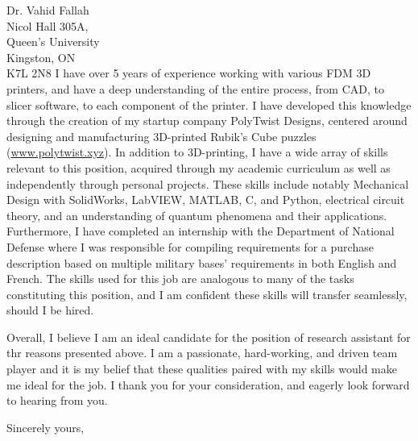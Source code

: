 \documentclass[11pt]{letter} %
\begin{document}
\begin{letter}{Dr. Vahid Fallah \\
Nicol Hall 305A, \\
Queen's University \\
Kingston, ON \\
K7L 2N8}
I have over 5 years of experience working with various FDM 3D printers, and have a deep understanding of the entire process, from CAD, to slicer software, to each component of the printer. I have developed this knowledge through the creation of my startup company PolyTwist Designs, centered around designing and manufacturing 3D-printed Rubik's Cube puzzles (\url{www.polytwist.xyz}). In addition to 3D-printing, I have a wide array of skills relevant to this position, acquired through my academic curriculum as well as independently through personal projects. These skills include notably Mechanical Design with SolidWorks, LabVIEW, MATLAB, C, and Python, electrical circuit theory, and an understanding of quantum phenomena and their applications. Furthermore, I have completed an internship with the Department of National Defense where I was responsible for compiling requirements for a purchase description based on multiple military bases' requirements in both English and French. The skills used for this job are analogous to many of the tasks constituting this position, and I am confident these skills will transfer seamlessly, should I be hired.

Overall, I believe I am an ideal candidate for the position of research assistant for thr reasons presented above. I am a passionate, hard-working, and driven team player and it is my belief that these qualities paired with my skills would make me ideal for the job. I thank you for your consideration, and eagerly look forward to hearing from you.

\closing{Sincerely yours,}


\end{letter}
\end{document}
